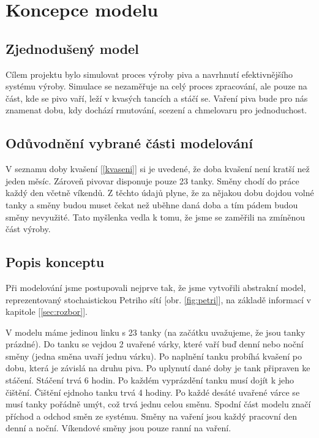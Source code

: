 \documentclass[11pt,a4paper]{article}
\begin{document}
\section{Koncepce modelu}

\subsection{Zjednodušený model}
Cílem projektu bylo simulovat proces výroby piva a navrhnutí efektivnějšího systému výroby. Simulace se nezaměřuje na celý proces zpracování, ale pouze na část, kde se pivo vaří, leží v kvasých tancích a stáčí se. Vaření piva bude pro nás znamenat dobu, kdy dochází rmutování, scezení a chmelovaru pro jednoduchost.

\subsection{Odůvodnění vybrané části modelování}
V seznamu doby kvašení [\ref{kvaseni}] si je uvedené, že doba kvašení není kratší než jeden měsíc. Zároveň pivovar disponuje pouze 23 tanky. Směny chodí do práce každý den včetně víkendů. Z těchto údajů plyne, že za nějakou dobu dojdou volné tanky a směny budou muset čekat než uběhne daná doba a tím pádem budou směny nevyužité. Tato myšlenka vedla k tomu, že jsme se zaměřili na zmíněnou část výroby.

\subsection{Popis konceptu}
Při modelování jsme postupovali nejprve tak, že jsme vytvořili abstrakní model, reprezentovaný stochaistickou Petriho sítí [obr. \ref{fig:petri}], na základě informací v kapitole [\ref{sec:rozbor}].

V modelu máme jedinou linku s 23 tanky (na začátku uvažujeme, že jsou tanky prázdné). Do tanku se vejdou 2 uvařené várky, které vaří buď denní nebo noční směny (jedna směna uvaří jednu várku). Po naplnění tanku probíhá kvašení po dobu, která je závislá na druhu piva. Po uplynutí dané doby je tank připraven ke stáčení. Stáčení trvá 6 hodin. Po každém vyprázdění tanku musí dojít k jeho čištění. Čištění ejdnoho tanku trvá 4 hodiny. Po každé desáté uvařené várce se musí tanky pořádně umýt, což trvá jednu celou směnu. Spodní část modelu značí příchod a odchod směn ze systému. Směny na vaření jsou každý pracovní den denní a noční. Víkendové směny jsou pouze ranní na vaření.
\end{document}

